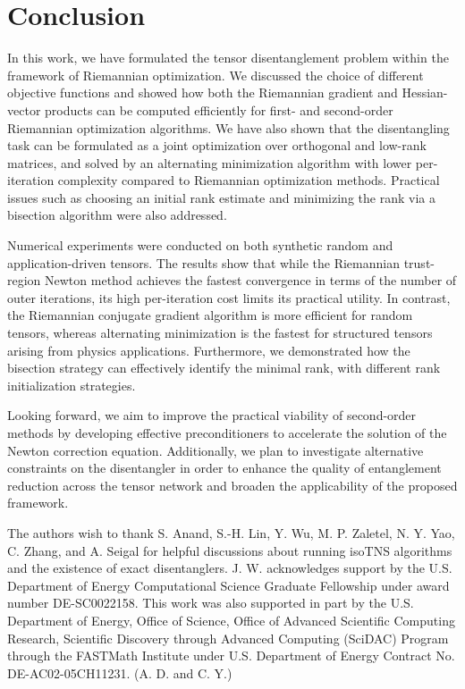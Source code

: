 \documentclass[pdflatex,sn-mathphys-num]{sn-jnl}
\newcounter{thm}[section]
\begin{document}
\section{Conclusion}
\label{sec:conclude}
In this work, we have formulated the tensor disentanglement problem within the framework of Riemannian optimization. We discussed the choice of different objective functions and showed how both the Riemannian gradient and Hessian-vector products can be computed efficiently for first- and second-order Riemannian optimization algorithms. We have also shown that the disentangling task can be formulated as a joint optimization over orthogonal and low-rank matrices, and solved by an alternating minimization algorithm with lower per-iteration complexity compared to Riemannian optimization methods. Practical issues such as choosing an initial rank estimate and minimizing the rank via a bisection algorithm were also addressed. 

Numerical experiments were conducted on both synthetic random and application-driven tensors. The results show that while the Riemannian trust-region Newton method achieves the fastest convergence in terms of the number of outer iterations, its high per-iteration cost limits its practical utility. In contrast, the Riemannian conjugate gradient algorithm is more efficient for random tensors, whereas alternating minimization is the fastest for structured tensors arising from physics applications. Furthermore, we demonstrated how the bisection strategy can effectively identify the minimal rank, with different rank initialization strategies.

Looking forward, we aim to improve the practical viability of second-order methods by developing effective preconditioners to accelerate the solution of the Newton correction equation. Additionally, we plan to investigate alternative constraints on the disentangler in order to enhance the quality of entanglement reduction across the tensor network and broaden the applicability of the proposed framework.

The authors wish to thank S. Anand, S.-H. Lin, Y. Wu, M. P. Zaletel, N. Y. Yao, C. Zhang, and A. Seigal for helpful discussions about running isoTNS algorithms and the existence of exact disentanglers. J. W. acknowledges support by the U.S. Department of Energy Computational Science Graduate Fellowship under award number DE-SC0022158. This work was also supported in part by the U.S. Department of Energy, Office of Science, Office of Advanced Scientific Computing Research, Scientific Discovery through Advanced Computing (SciDAC) Program through the FASTMath Institute under U.S. Department of Energy Contract No. DE-AC02-05CH11231. (A. D. and C. Y.)

%

\end{document}
